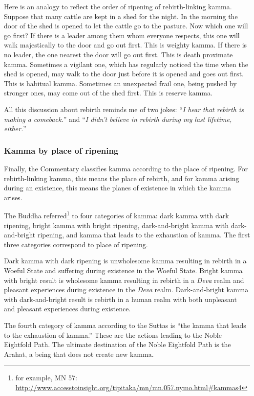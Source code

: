 Here is an analogy to reflect the order of ripening of rebirth-linking kamma. Suppose that many cattle are kept in a shed for the night. In the morning the door of the shed is opened to let the cattle go to the pasture. Now which one will go first? If there is a leader among them whom everyone respects, this one will walk majestically to the door and go out first. This is weighty kamma. If there is no leader, the one nearest the door will go out first. This is death proximate kamma. Sometimes a vigilant one, which has regularly noticed the time when the shed is opened, may walk to the door just before it is opened and goes out first. This is habitual kamma. Sometimes an unexpected frail one, being pushed by stronger ones, may come out of the shed first. This is reserve kamma.

All this discussion about rebirth reminds me of two jokes: “\textit{I hear that rebirth is making a comeback.}” and “\textit{I didn’t believe in rebirth during my last lifetime, either.}”

\pagebreak

\subsubsection*{Kamma by place of ripening}

Finally, the Commentary classifies kamma according to the place of ripening. For rebirth-linking kamma, this means the place of rebirth, and for kamma arising during an existence, this means the planes of existence in which the kamma arises.

The Buddha referred\footnote{for example, MN 57: \url{http://www.accesstoinsight.org/tipitaka/mn/mn.057.nymo.html\#kammas4}} to four categories of kamma: dark kamma with dark ripening, bright kamma with bright ripening, dark-and-bright kamma with dark-and-bright ripening, and kamma that leads to the exhaustion of kamma. The first three categories correspond to place of ripening.

Dark kamma with dark ripening is unwholesome kamma resulting in rebirth in a Woeful State and suffering during existence in the Woeful State. Bright kamma with bright result is wholesome kamma resulting in rebirth in a \textit{Deva} realm and pleasant experiences during existence in the \textit{Deva} realm. Dark-and-bright kamma with dark-and-bright result is rebirth in a human realm with both unpleasant and pleasant experiences during existence. 

The fourth category of kamma according to the Suttas is “the kamma that leads to the exhaustion of kamma.” These are the actions leading to the Noble Eightfold Path. The ultimate destination of the Noble Eightfold Path is the Arahat, a being that does not create new kamma.

